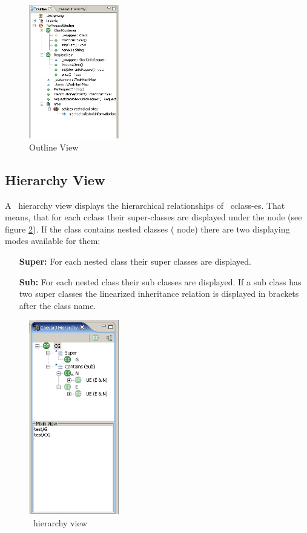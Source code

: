 \begin{figure}[htbp]
	\centering
		\includegraphics[width=0.35\textwidth]{images/outline.png}
	\caption{Outline View}
	\label{fig:outline_view}
\end{figure}

\subsection{Hierarchy View\label{hierarchyview}}
A \caesarj ~hierarchy view displays the hierarchical relationships of \caesarj ~cclass-es. That means, that for each cclass their super-classes are displayed under the  node (see figure \ref{fig:hierarchy_view}). If the class contains nested classes ( node) there are two displaying modes available for them:
\begin{itemize}
	\item[\textbf{Super:}] For each nested class their super classes are displayed.
	\item[\textbf{Sub:}] For each nested class their sub classes are displayed. If a sub class has two super classes the linearized inheritance relation is displayed in brackets after the class name.
\end{itemize}

\begin{figure}[htbp]
	\centering
		\includegraphics[width=0.35\textwidth]{images/hierarchy.png}
	\caption{\caesarj ~hierarchy view}
	\label{fig:hierarchy_view}
\end{figure}

